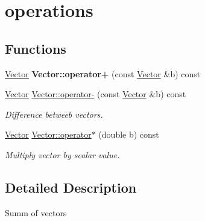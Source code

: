 \hypertarget{group__binary}{}\section{operations}
\label{group__binary}
\subsection*{Functions}
\begin{DoxyCompactItemize}
\item 
\mbox{\label{group__binary_ga292963338c3d59c00ea9f89b0d7d999e}} 
\mbox{\hyperlink{struct_vector}{Vector}} {\bfseries Vector\+::operator+} (const \mbox{\hyperlink{struct_vector}{Vector}} \&b) const
\item 
\mbox{\label{group__binary_gaa01edc71eb1c937b8e86db4a638f9b8b}} 
\mbox{\hyperlink{struct_vector}{Vector}} \mbox{\hyperlink{group__binary_gaa01edc71eb1c937b8e86db4a638f9b8b}{Vector\+::operator-\/}} (const \mbox{\hyperlink{struct_vector}{Vector}} \&b) const
\begin{DoxyCompactList}\small\item\em Difference betweeb vectors. \end{DoxyCompactList}\item 
\mbox{\label{group__binary_ga067f826810d7565a09c1883f3883e940}} 
\mbox{\hyperlink{struct_vector}{Vector}} \mbox{\hyperlink{group__binary_ga067f826810d7565a09c1883f3883e940}{Vector\+::operator$\ast$}} (double b) const
\begin{DoxyCompactList}\small\item\em Multiply vector by scalar value. \end{DoxyCompactList}\end{DoxyCompactItemize}


\subsection{Detailed Description}
Summ of vectors 